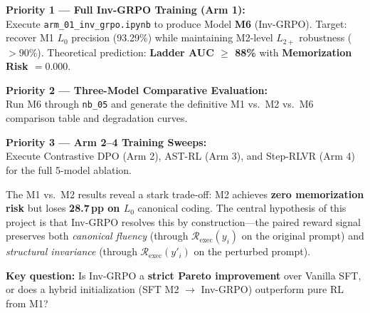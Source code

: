 \documentclass[12pt, a4paper]{article}
\begin{document}
\begin{keybox}[title={\faClock\ Week 9 Roadmap}]
\textbf{Priority 1 --- Full Inv-GRPO Training (Arm 1):}\\
Execute \texttt{arm\_01\_inv\_grpo.ipynb} to produce Model \textbf{M6} (Inv-GRPO). Target: recover M1 $L_0$ precision (93.29\%) while maintaining M2-level $L_{2+}$ robustness ($>90\%$). Theoretical prediction: \textbf{Ladder AUC $\geq$ 88\%} with \textbf{Memorization Risk $= 0.000$}.

\vspace{0.4em}
\textbf{Priority 2 --- Three-Model Comparative Evaluation:}\\
Run M6 through \texttt{nb\_05} and generate the definitive M1 vs.\ M2 vs.\ M6 comparison table and degradation curves.

\vspace{0.4em}
\textbf{Priority 3 --- Arm 2--4 Training Sweeps:}\\
Execute Contrastive DPO (Arm 2), AST-RL (Arm 3), and Step-RLVR (Arm 4) for the full 5-model ablation.
\end{keybox}

\begin{domainbox}[title={\faQuestion\ Open Scientific Question for Dr.\ Ghada Soliman}]
The M1 vs.\ M2 results reveal a stark trade-off: M2 achieves \textbf{zero memorization risk} but loses \textbf{28.7\,pp on $L_0$} canonical coding. The central hypothesis of this project is that Inv-GRPO resolves this by construction---the paired reward signal preserves both \emph{canonical fluency} (through $\mathcal{R}_{\text{exec}}(y_i)$ on the original prompt) and \emph{structural invariance} (through $\mathcal{R}_{\text{exec}}(y'_i)$ on the perturbed prompt).

\textbf{Key question:} Is Inv-GRPO a \textbf{strict Pareto improvement} over Vanilla SFT, or does a hybrid initialization (SFT M2 $\to$ Inv-GRPO) outperform pure RL from M1?
\end{domainbox}

\newpage
\printbibliography[heading=bibintoc, title={References \& Cited Literature}]
\end{document}
